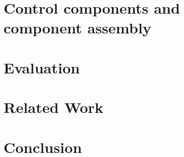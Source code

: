 \documentclass{acm_proc_article-sp}
\begin{document}
\section{Control components and component assembly}
\label{sect:component}

\section{Evaluation}
\label{sect:eval}

\section{Related Work}
\label{sect:related}

\section{Conclusion}
\label{sect:conclusion}



  
\end{document}
